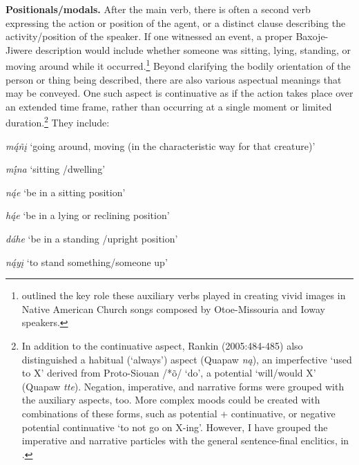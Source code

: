 \documentclass[output=paper]{LSP/langsci}
\begin{document}
\vspace{1em}
\textbf{Positionals/modals.}  After the main verb, there is often a second verb expressing the action or position of the agent, or a distinct clause describing the activity/position of the speaker.  If one witnessed an event, a proper Baxoje-Jiwere description would include whether someone was sitting, lying, standing, or moving around while it occurred.\footnote{\citealt{Davidson1997} outlined the key role these auxiliary verbs played in creating vivid images in Native American Church songs composed by Otoe-Missouria and Ioway speakers.}  Beyond clarifying the bodily orientation of the person or thing being described, there are also various aspectual meanings that may be conveyed.  One such aspect is continuative as if the action takes place over an extended time frame, rather than occurring at a single moment or limited duration.\footnote{In addition to the continuative aspect, Rankin (2005:484-485) also distinguished a habitual (`always') aspect (Quapaw \textit{n\k{a}}), an imperfective `used to X' derived from Proto-Siouan /*\~o/ `do', a potential `will/would X' (Quapaw \textit{tte}). Negation, imperative, and narrative forms were grouped with the auxiliary aspects, too. More complex moods could be created with combinations of these forms, such as potential + continuative, or negative potential continuative `to not go on X-ing'. However, I have grouped the imperative and narrative particles with the general sentence-final enclitics, in .} They include:

\hspace{2em} \textit{m\k{á}\~n\k{i}} `going around, moving (in the characteristic way for that creature)'
	
\hspace{2em} \textit{m\k{\'i}na}  `sitting /dwelling'

\hspace{2em} \textit{n\k{á}e} `be in a sitting position'

\hspace{2em} \textit{h\k{á}e}  `be in a lying or reclining position'

\hspace{2em} \textit{dáhe}  `be in a standing /upright position'

\hspace{2em} \textit{n\k{á}y\k{i}}   `to stand something/someone up'
\end{document}
